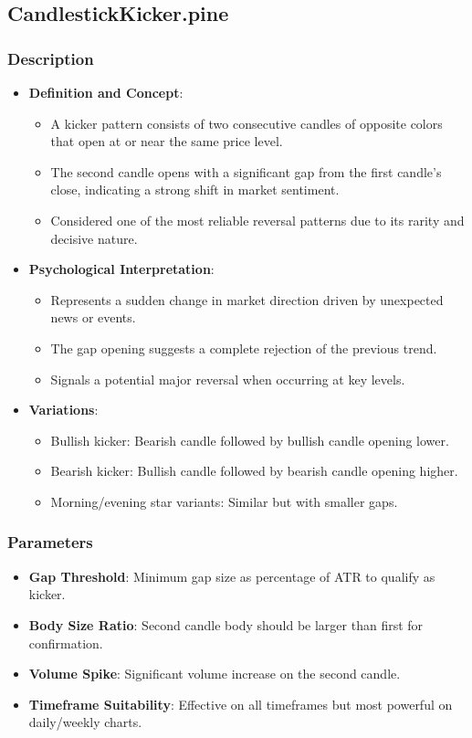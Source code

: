 \documentclass[12pt]{article}
\begin{document}
\subsection{CandlestickKicker.pine}
\label{subsec:kicker}

\subsubsection{Description}
\begin{itemize}
\item \textbf{Definition and Concept}:
  \begin{itemize}
  \item A kicker pattern consists of two consecutive candles of opposite colors that open at or near the same price level.
  \item The second candle opens with a significant gap from the first candle's close, indicating a strong shift in market sentiment.
  \item Considered one of the most reliable reversal patterns due to its rarity and decisive nature.
  \end{itemize}
\item \textbf{Psychological Interpretation}:
  \begin{itemize}
  \item Represents a sudden change in market direction driven by unexpected news or events.
  \item The gap opening suggests a complete rejection of the previous trend.
  \item Signals a potential major reversal when occurring at key levels.
  \end{itemize}
\item \textbf{Variations}:
  \begin{itemize}
  \item Bullish kicker: Bearish candle followed by bullish candle opening lower.
  \item Bearish kicker: Bullish candle followed by bearish candle opening higher.
  \item Morning/evening star variants: Similar but with smaller gaps.
  \end{itemize}
\end{itemize}

\subsubsection{Parameters}
\begin{itemize}
\item \textbf{Gap Threshold}: Minimum gap size as percentage of ATR to qualify as kicker.
\item \textbf{Body Size Ratio}: Second candle body should be larger than first for confirmation.
\item \textbf{Volume Spike}: Significant volume increase on the second candle.
\item \textbf{Timeframe Suitability}: Effective on all timeframes but most powerful on daily/weekly charts.
\end{itemize}
\end{document}
